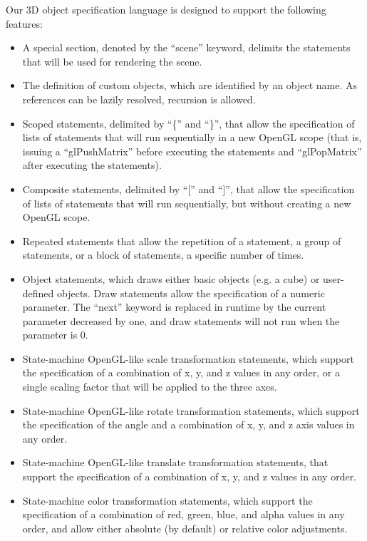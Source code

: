 \documentclass[floatfix,rmp,twocolumn,twoside]{revtex4}
\begin{document}
Our 3D object specification language is designed to support the following features:

\begin{itemize}
\item A special section, denoted by the ``scene'' keyword, delimits the statements that will be used for rendering the scene.
\item The definition of custom objects, which are identified by an object name. As references can be lazily resolved, recursion is allowed.
\item Scoped statements, delimited by ``\{'' and ``\}'', that allow the specification of lists of statements that will run sequentially in a new OpenGL scope (that is, issuing a ``glPushMatrix'' before executing the statements and ``glPopMatrix'' after executing the statements).
\item Composite statements, delimited by ``['' and ``]'', that allow the specification of lists of statements that will run sequentially, but without creating a new OpenGL scope.
\item Repeated statements that allow the repetition of a statement, a group of statements, or a block of statements, a specific number of times.
\item Object statements, which draws either basic objects (e.g. a cube) or user-defined objects. Draw statements allow the specification of a numeric parameter. The ``next'' keyword is replaced in runtime by the current parameter decreased by one, and draw statements will not run when the parameter is 0.
\item State-machine OpenGL-like scale transformation statements, which support the specification of a combination of x, y, and z values in any order, or a single scaling factor that will be applied to the three axes.
\item State-machine OpenGL-like rotate transformation statements, which support the specification of the angle and a combination of x, y, and z axis values in any order.
\item State-machine OpenGL-like translate transformation statements, that support the specification of a combination of x, y, and z values in any order.
\item State-machine color transformation statements, which support the specification of a combination of red, green, blue, and alpha values in any order, and allow either absolute (by default) or relative color adjustments.
\end{itemize}
\end{document}

